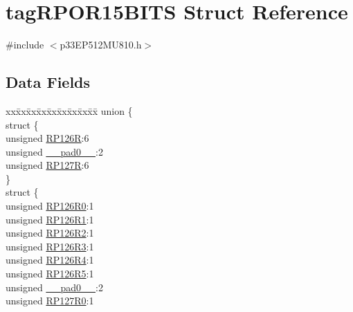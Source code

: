 \hypertarget{structtag_r_p_o_r15_b_i_t_s}{}\section{tag\+R\+P\+O\+R15\+B\+I\+TS Struct Reference}
\label{structtag_r_p_o_r15_b_i_t_s}


{\ttfamily \#include $<$p33\+E\+P512\+M\+U810.\+h$>$}

\subsection*{Data Fields}
\begin{DoxyCompactItemize}
\item 
\begin{tabbing}
xx\=xx\=xx\=xx\=xx\=xx\=xx\=xx\=xx\=\kill
union \{\\
\>struct \{\\
\>\>unsigned \hyperlink{structtag_r_p_o_r15_b_i_t_s_a473fd3a31f1ef3e5135890ef731a3474}{RP126R}:6\\
\>\>unsigned \hyperlink{structtag_r_p_o_r15_b_i_t_s_adf71f3d8410c1f1dbbc96680a92c49af}{\_\_pad0\_\_}:2\\
\>\>unsigned \hyperlink{structtag_r_p_o_r15_b_i_t_s_acc1e73e7f5a474f174933f0733fa748b}{RP127R}:6\\
\>\} \\
\>struct \{\\
\>\>unsigned \hyperlink{structtag_r_p_o_r15_b_i_t_s_aced094b459b930be92d77ce052718c54}{RP126R0}:1\\
\>\>unsigned \hyperlink{structtag_r_p_o_r15_b_i_t_s_ac619f49697e150f5581407d8de68a99f}{RP126R1}:1\\
\>\>unsigned \hyperlink{structtag_r_p_o_r15_b_i_t_s_ae9d3729568102b1d911547c813a3f88e}{RP126R2}:1\\
\>\>unsigned \hyperlink{structtag_r_p_o_r15_b_i_t_s_ab591ea14f4ed786b376650691980490c}{RP126R3}:1\\
\>\>unsigned \hyperlink{structtag_r_p_o_r15_b_i_t_s_adcd3fdeef6bc02e77049f5045524c98b}{RP126R4}:1\\
\>\>unsigned \hyperlink{structtag_r_p_o_r15_b_i_t_s_a696ddbdaa299fe2e04608301a9402228}{RP126R5}:1\\
\>\>unsigned \hyperlink{structtag_r_p_o_r15_b_i_t_s_adf71f3d8410c1f1dbbc96680a92c49af}{\_\_pad0\_\_}:2\\
\>\>unsigned \hyperlink{structtag_r_p_o_r15_b_i_t_s_ad7705d3ee1f5e5746de492742dac9449}{RP127R0}:1\\

\end{tabbing}
\end{DoxyCompactItemize}
